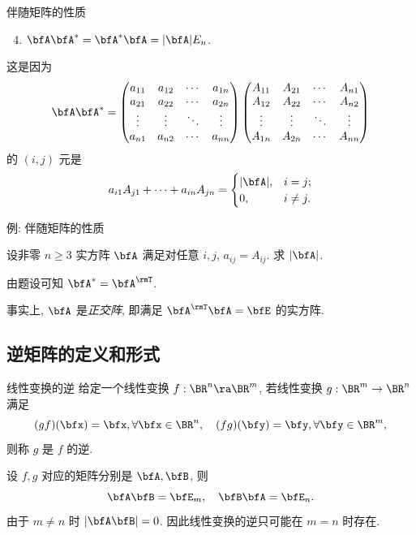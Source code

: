 \begin{frame}{伴随矩阵的性质}
	\begin{second@}
		\begin{enumerate}
			\setcounter{enumi}{3}
			\item \alert{$\bfA\bfA^*=\bfA^*\bfA=|\bfA|E_n$.}
		\end{enumerate}
	\end{second@}
	\onslide<+->
	这是因为
	\[\bfA\bfA^*=\begin{pmatrix}
		a_{11}&a_{12}&\cdots &a_{1n}\\
		a_{21}&a_{22}&\cdots &a_{2n}\\
		\vdots&\vdots&\ddots&\vdots\\
		a_{n1}&a_{n2}&\cdots &a_{nn}
	\end{pmatrix}\begin{pmatrix}
		A_{11}&A_{21}&\cdots&A_{n1}\\
		A_{12}&A_{22}&\cdots&A_{n2}\\
		\vdots&\vdots&\ddots&\vdots\\
		A_{1n}&A_{2n}&\cdots&A_{nn}
	\end{pmatrix}\]
	\onslide<+->
	的 $(i,j)$ 元是
	\[a_{i1}A_{j1}+\cdots+a_{in}A_{jn}=\begin{cases}
		|\bfA|,&i=j;\\
		0,&i\neq j.
	\end{cases}\]
\end{frame}


\begin{frame}{例: 伴随矩阵的性质}
	\onslide<+->
	\begin{example}
		设非零 $n\ge 3$ 实方阵 $\bfA$ 满足对任意 $i,j$, $a_{ij}=A_{ij}$. 求 $|\bfA|$.
	\end{example}
	\onslide<+->
	\begin{solution}
		由题设可知 $\bfA^*=\bfA^\rmT$.
		\onslide<+->{%
			因此 $|\bfA|=|\bfA^*|=|\bfA|^{n-1}$.
		}

	\end{solution}
	\onslide<+->
	事实上, $\bfA$ 是\emph{正交阵}, 即满足 $\bfA^\rmT\bfA=\bfE$ 的实方阵.
\end{frame}



\subsection{逆矩阵的定义和形式}
\begin{frame}{线性变换的逆}
	\onslide<+->
	给定一个线性变换 $f:\BR^n\ra\BR^m$, 若线性变换 $g:\BR^m\to\BR^n$ 满足
	\[(gf)(\bfx)=\bfx,\forall \bfx\in\BR^n,\quad
	(fg)(\bfy)=\bfy,\forall \bfy\in\BR^m,\]
	\onslide<+->
	则称 $g$ 是 $f$ 的逆.

	\onslide<+->
	设 $f,g$ 对应的矩阵分别是 $\bfA,\bfB$, 则
	\[\bfA\bfB=\bfE_m,\quad \bfB\bfA=\bfE_n.\]
	\onslide<+->
	由于 $m\neq n$ 时 $|\bfA\bfB|=0$.
	\onslide<+->
	因此线性变换的逆只可能在 $m=n$ 时存在.
\end{frame}


